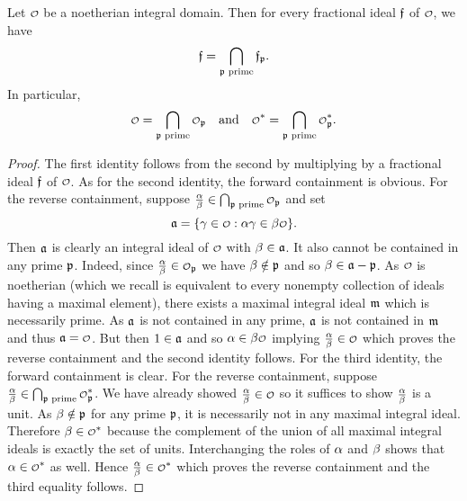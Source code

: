     \begin{proposition}\label{prop:ring_is_intersection_of_all_localizations}
      Let $\smc{O}$ be a noetherian integral domain. Then for every fractional ideal $\mathfrak{f}$ of $\smc{O}$, we have
      \[
        \mathfrak{f} = \bigcap_{\text{$\mathfrak{p}$ prime}}\mathfrak{f}_{\mathfrak{p}}.
      \]
      In particular,
      \[
        \smc{O} = \bigcap_{\text{$\mf{p}$ prime}}\smc{O}_{\mf{p}} \quad \text{and} \quad \smc{O}^{\ast} = \bigcap_{\text{$\mf{p}$ prime}}\smc{O}_{\mf{p}}^{\ast}.
      \]
    \end{proposition}
    \begin{proof}
      The first identity follows from the second by multiplying by a fractional ideal $\mathfrak{f}$ of $\smc{O}$. As for the second identity, the forward containment is obvious. For the reverse containment, suppose $\frac{\a}{\b} \in \bigcap_{\text{$\mf{p}$ prime}}\smc{O}_{\mf{p}}$ and set
      \[
        \mf{a} = \{\g \in \smc{O}:\a\g \in \b\smc{O}\}.
      \]
      Then $\mathfrak{a}$ is clearly an integral ideal of $\smc{O}$ with $\beta \in \mathfrak{a}$. It also cannot be contained in any prime $\mathfrak{p}$. Indeed, since $\frac{\a}{\b} \in \smc{O}_{\mf{p}}$ we have $\beta \notin \mathfrak{p}$ and so $\beta \in \mathfrak{a}-\mathfrak{p}$. As $\smc{O}$ is noetherian (which we recall is equivalent to every nonempty collection of ideals having a maximal element), there exists a maximal integral ideal $\mathfrak{m}$ which is necessarily prime. As $\mathfrak{a}$ is not contained in any prime, $\mathfrak{a}$ is not contained in $\mathfrak{m}$ and thus $\mf{a} = \smc{O}$. But then $1 \in \mathfrak{a}$ and so $\a \in \b\smc{O}$ implying $\frac{\a}{\b} \in \smc{O}$ which proves the reverse containment and the second identity follows. For the third identity, the forward containment is clear. For the reverse containment, suppose $\frac{\a}{\b} \in \bigcap_{\text{$\mf{p}$ prime}}\smc{O}_{\mf{p}}^{\ast}$. We have already showed $\frac{\a}{\b} \in \smc{O}$ so it suffices to show $\frac{\alpha}{\beta}$ is a unit. As $\beta \notin \mathfrak{p}$ for any prime $\mathfrak{p}$, it is necessarily not in any maximal integral ideal. Therefore $\b \in \smc{O}^{\ast}$ because the complement of the union of all maximal integral ideals is exactly the set of units. Interchanging the roles of $\alpha$ and $\beta$ shows that $\a \in \smc{O}^{\ast}$ as well. Hence $\frac{\a}{\b} \in \smc{O}^{\ast}$ which proves the reverse containment and the third equality follows.
    \end{proof}

